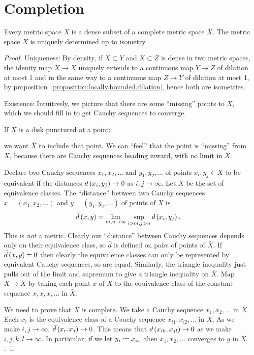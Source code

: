 \section{Completion}
\begin{theorem}
Every metric space \(X\) is a dense subset of a complete metric space \(\bar{X}\).
The metric space \(\bar{X}\) is uniquely determined up to isometry.
\end{theorem}
\begin{proof}
Uniqueness: By density, if \(X \subset Y\) and \(X \subset Z\) is dense in two metric spaces, the idenity map \(X \to X\) uniquely extends to a continuous map \(Y \to Z\) of dilation at most 1 and in the same way to a continuous map \(Z \to Y\) of dilation at most 1, by proposition~\vref{proposition:locally.bounded.dilation}, hence both are isometries.

Existence: Intuitively, we picture that there are some ``missing'' points to \(X\), which we should fill in to get Cauchy sequences to converge.
\begin{example} If \(X\) is a disk punctured at a point:
\begin{center}

\end{center}
we want \(\bar{X}\) to include that point.
We can ``feel'' that the point is ``missing'' from \(X\), because there are Cauchy sequences heading inward, with no limit in \(X\):
\begin{center}

\end{center}
\end{example}
Declare two Cauchy sequences \(x_1,x_2,\dots\) and \(y_1,y_2,\dots\) of points \(x_i, y_j \in X\) to be equivalent if the distances \(d\left(x_i,y_j\right) \to 0\) as \(i,j \to \infty\).
Let \(\bar{X}\) be the set of equivalence classes.
The ``distance'' between two Cauchy sequences \(x=(x_1,x_2,\dots)\) and \(y=(y_1,y_2,\dots)\) of points of \(X\) is
\[
\bar{d}\left(x,y\right)=\lim_{m,n \to \infty} \sup_{i>m,j>n} d\left(x_i,y_j\right).
\]
This is \emph{not} a metric.
Clearly our ``distance'' between Cauchy sequences depends only on their equivalence class, so \(\bar{d}\) is defined on pairs of points of \(\bar{X}\).
If \(\bar{d}\left(x,y\right)=0\) then clearly the equivalence classes can only be represented by equivalent Cauchy sequences, so are equal.
Similarly, the triangle inequality just pulls out of the limit and supremum to give a triangle inequality on \(\bar{X}\).
Map \(X \to \bar{X}\) by taking each point \(x\) of \(X\) to the equivalence class of the constant sequence \(x,x,x,\dots\) in \(\bar{X}\).

We need to prove that \(\bar{X}\) is complete.
We take a Cauchy sequence \(x_1, x_2, \dots\) in \(\bar{X}\).
Each \(x_i\) is the equivalence class of a Cauchy sequence \(x_{i1}, x_{i2}, \dots\) in \(X\).
As we make \(i,j \to \infty\), \(\bar{d}\left(x_i,x_j\right) \to 0\).
This means that \(d\left(x_{ik},x_{jl}\right) \to 0\) as we make \(i,j,k,l \to \infty\).
In particular, if we let \(y_i\defeq x_{ii}\), then \(x_1, x_2, \dots\) converges to \(y\) in \(\bar{X}\).
\end{proof}

